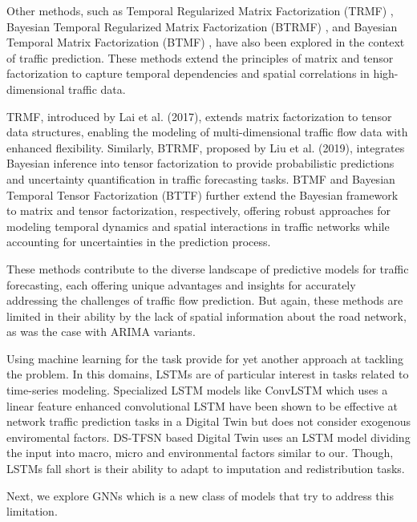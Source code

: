 Other methods, such as Temporal Regularized Matrix Factorization (TRMF) \cite{trmf}, Bayesian Temporal Regularized Matrix Factorization (BTRMF) \cite{btrmf}, and Bayesian Temporal Matrix Factorization (BTMF) \cite{btrmf}, have also been explored in the context of traffic prediction\cite{baytencomp}. These methods extend the principles of matrix and tensor factorization to capture temporal dependencies and spatial correlations in high-dimensional traffic data.

TRMF, introduced by Lai et al. (2017), extends matrix factorization to tensor data structures, enabling the modeling of multi-dimensional traffic flow data with enhanced flexibility. Similarly, BTRMF, proposed by Liu et al. (2019), integrates Bayesian inference into tensor factorization to provide probabilistic predictions and uncertainty quantification in traffic forecasting tasks. BTMF and Bayesian Temporal Tensor Factorization (BTTF) further extend the Bayesian framework to matrix and tensor factorization, respectively, offering robust approaches for modeling temporal dynamics and spatial interactions in traffic networks while accounting for uncertainties in the prediction process.

These methods contribute to the diverse landscape of predictive models for traffic forecasting, each offering unique advantages and insights for accurately addressing the challenges of traffic flow prediction. But again, these methods are limited in their ability by the lack of spatial information about the road network, as was the case with ARIMA variants.

Using machine learning for the task provide for yet another approach at tackling the problem. In this domains, LSTMs are of particular interest in tasks related to time-series modeling. Specialized LSTM models like ConvLSTM\cite{lai2023deep} which uses a linear feature enhanced convolutional LSTM have been shown to be effective at network traffic prediction tasks in a Digital Twin but does not consider exogenous enviromental factors. DS-TFSN\cite{dftfsn} based Digital Twin uses an LSTM model dividing the input into macro, micro and environmental factors similar to our. Though, LSTMs fall short is their ability to adapt to imputation and redistribution tasks.

Next, we explore GNNs which is a new class of models that try to address this limitation.

